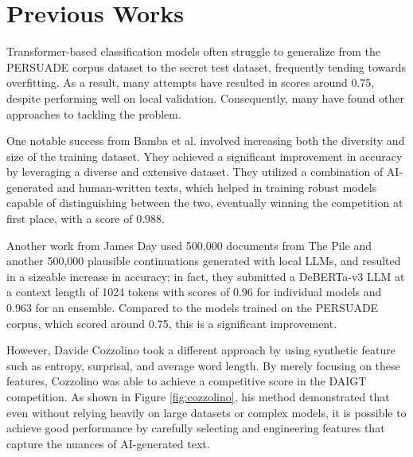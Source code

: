 \documentclass[conference]{IEEEtran}
\begin{document}
\section{Previous Works}

Transformer-based classification models often struggle to generalize from the PERSUADE corpus dataset to the secret test dataset, frequently tending towards overfitting. As a result, many attempts have resulted in scores around 0.75, despite performing well on local validation. Consequently, many have found other approaches to tackling the problem.

One notable success from Bamba et al. \cite{1stplace} involved increasing both the diversity and size of the training dataset. Yhey achieved a significant improvement in accuracy by leveraging a diverse and extensive dataset. They utilized a combination of AI-generated and human-written texts, which helped in training robust models capable of distinguishing between the two, eventually winning the competition at first place, with a score of 0.988.

Another work from James Day \cite{5thplace} used 500,000 documents from The Pile and another 500,000 plausible continuations generated with local LLMs, and resulted in a sizeable increase in accuracy; in fact, they submitted a DeBERTa-v3 LLM at a context length of 1024 tokens with scores of 0.96 for individual models and 0.963 for an ensemble. Compared to the models trained on the PERSUADE corpus, which scored around 0.75, this is a significant improvement.

However, Davide Cozzolino \cite{6thplace} took a different approach by using synthetic feature such as entropy, surprisal, and average word length. By merely focusing on these features, Cozzolino was able to achieve a competitive score in the DAIGT competition. As shown in Figure \ref{fig:cozzolino}, his method demonstrated that even without relying heavily on large datasets or complex models, it is possible to achieve good performance by carefully selecting and engineering features that capture the nuances of AI-generated text.
\end{document}
